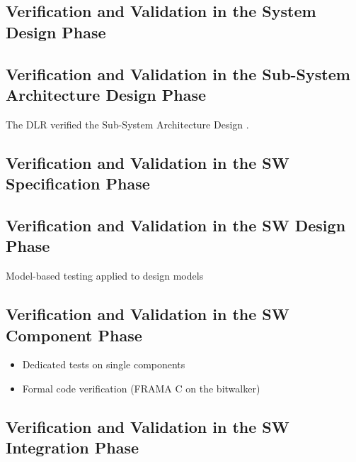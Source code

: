 \documentclass{template/openetcs_article}
\begin{document}
\subsection{Verification and Validation in the System Design Phase}
\label{sec:vnv-1}




\subsection{Verification and Validation in the Sub-System Architecture Design Phase}
\label{sec:vnv-2}

The DLR verified the Sub-System Architecture Design
. 

\subsection{Verification and Validation in the SW Specification Phase}
\label{sec:vnv-3}

\subsection{Verification and Validation in the SW Design Phase}
\label{sec:vnv-4}

Model-based testing applied to design models  

\subsection{Verification and Validation in the SW Component Phase}
\label{sec:vnv-5}

\begin{itemize}
\item Dedicated tests on single components 
\item Formal code verification (FRAMA C on the bitwalker)
\end{itemize}


\subsection{Verification and Validation in the SW Integration Phase}
\label{sec:vnv-6}
\end{document}
